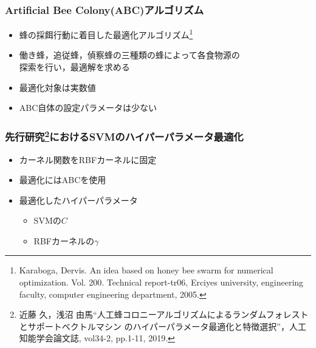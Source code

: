 \documentclass[11pt,dvipdfmx,cjk]{beamer}
\begin{document}
  \begin{frame}
    \frametitle{Artificial Bee Colony(ABC)アルゴリズム}
    \begin{itemize}
      \item 蜂の採餌行動に着目した最適化アルゴリズム\footnote{Karaboga, Dervis. An idea based on honey bee swarm for numerical optimization. Vol. 200. Technical report-tr06, Erciyes university, engineering faculty, computer engineering department, 2005.}
      \item 働き蜂，追従蜂，偵察蜂の三種類の蜂によって各食物源の\\探索を行い，最適解を求める
      \item 最適化対象は実数値
      \item ABC自体の設定パラメータは少ない
    \end{itemize}
  \end{frame}
  \begin{frame}
    \frametitle{先行研究\footnote{近藤 久，浅沼 由馬“人工蜂コロニーアルゴリズムによるランダムフォレストとサポートベクトルマシン
    のハイパーパラメータ最適化と特徴選択”，人工知能学会論文誌, vol34-2, pp.1-11, 2019.}におけるSVMのハイパーパラメータ最適化}
    \begin{itemize}
      \item カーネル関数をRBFカーネルに固定
      \item  最適化にはABCを使用
      \item 最適化したハイパーパラメータ
      \begin{itemize}
        \item SVMの$C$
        \item RBFカーネルの$\gamma$
      \end{itemize}
    \end{itemize}
\end{frame}
\end{document}
